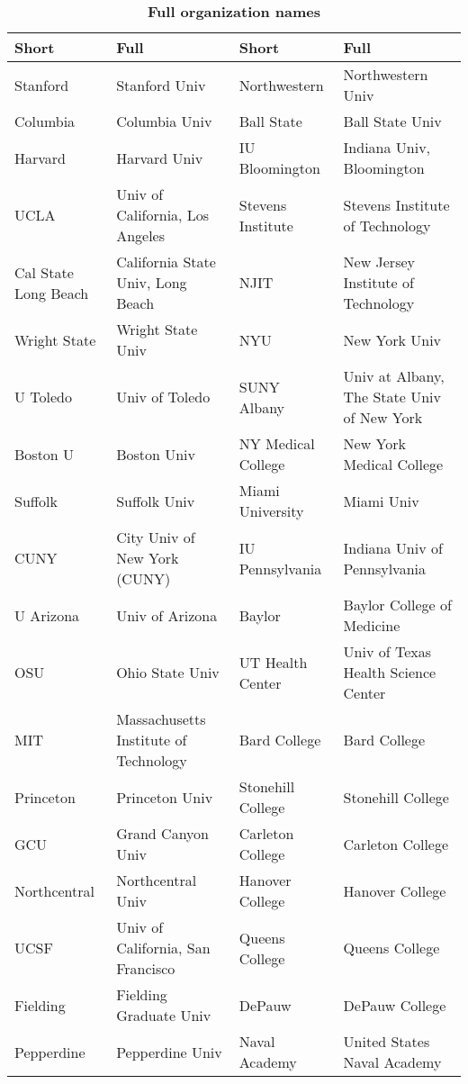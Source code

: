 \documentclass[12pt]{article} %
\begin{document}
\begin{table}[ht]
\centering
\caption{\textbf{Full organization names}}
\label{table:supp:orglabels}
\begin{adjustwidth}{-2cm}{}
\begingroup\scriptsize
\begin{tabular}{llll}
  \hline
Short & Full & Short & Full \\
  \hline
Stanford & Stanford Univ & Northwestern & Northwestern Univ \\
  Columbia & Columbia Univ & Ball State & Ball State Univ \\
  Harvard & Harvard Univ & IU Bloomington & Indiana Univ, Bloomington \\
  UCLA & Univ of California, Los Angeles & Stevens Institute & Stevens Institute of Technology \\
  Cal State Long Beach & California State Univ, Long Beach & NJIT & New Jersey Institute of Technology \\
  Wright State & Wright State Univ & NYU & New York Univ \\
  U Toledo & Univ of Toledo & SUNY Albany & Univ at Albany, The State Univ of New York \\
  Boston U & Boston Univ & NY Medical College & New York Medical College \\
  Suffolk & Suffolk Univ & Miami University & Miami Univ \\
  CUNY & City Univ of New York (CUNY) & IU Pennsylvania & Indiana Univ of Pennsylvania \\
  U Arizona & Univ of Arizona & Baylor & Baylor College of Medicine \\
  OSU & Ohio State Univ & UT Health Center & Univ of Texas Health Science Center \\
  MIT & Massachusetts Institute of Technology & Bard College & Bard College \\
  Princeton & Princeton Univ & Stonehill College & Stonehill College \\
  GCU & Grand Canyon Univ & Carleton College & Carleton College \\
  Northcentral & Northcentral Univ & Hanover College & Hanover College \\
  UCSF & Univ of California, San Francisco & Queens College & Queens College \\
  Fielding & Fielding Graduate Univ & DePauw & DePauw College \\
  Pepperdine & Pepperdine Univ & Naval Academy & United States Naval Academy \\

\end{tabular}
\end{adjustwidth}
\end{table}
\end{document}
